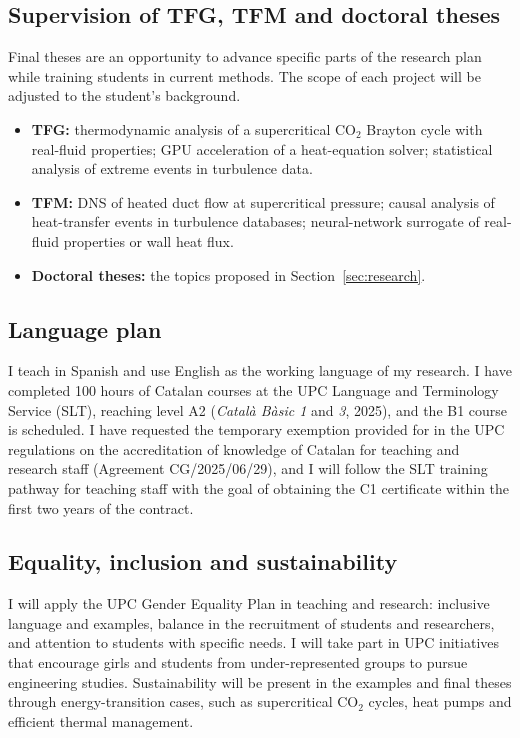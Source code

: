 \documentclass[11pt]{article}
\begin{document}
\subsection{Supervision of TFG, TFM and doctoral theses}\label{sec:theses}
Final theses are an opportunity to advance specific parts of the research plan while
training students in current methods. The scope of each project will be adjusted to the
student's background.
\begin{itemize}
  \item \textbf{TFG:} thermodynamic analysis of a supercritical CO$_2$ Brayton cycle with
  real-fluid properties; GPU acceleration of a heat-equation solver; statistical analysis
  of extreme events in turbulence data.
  \item \textbf{TFM:} DNS of heated duct flow at supercritical pressure; causal analysis of
  heat-transfer events in turbulence databases; neural-network surrogate of real-fluid
  properties or wall heat flux.
  \item \textbf{Doctoral theses:} the topics proposed in Section~\ref{sec:research}.
\end{itemize}

\subsection{Language plan}
I teach in Spanish and use English as the working language of my research. I have completed 100 hours of Catalan courses at the UPC Language and Terminology Service (SLT), reaching level A2 (\emph{Catal\`a B\`asic 1} and \emph{3}, 2025), and the B1 course is scheduled. I have requested the temporary exemption provided for in the UPC regulations on the accreditation of knowledge of Catalan for teaching and research staff (Agreement CG/2025/06/29), and I will follow the SLT training pathway for teaching staff with the goal of obtaining the C1 certificate within the first two years of the contract. 

\subsection{Equality, inclusion and sustainability}
I will apply the UPC Gender Equality Plan in teaching and research: inclusive language and
examples, balance in the recruitment of students and researchers, and attention to
students with specific needs. I will take part in UPC initiatives that encourage girls and
students from under-represented groups to pursue engineering studies. Sustainability will
be present in the examples and final theses through energy-transition cases, such as
supercritical CO$_2$ cycles, heat pumps and efficient thermal management.
\end{document}
